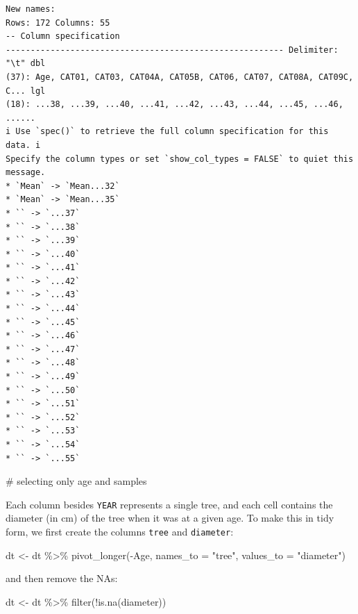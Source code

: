 \documentclass[
  letterpaper,
  DIV=11,
  numbers=noendperiod]{scrreprt}
\newenvironment{Shaded}{\begin{snugshade}}{\end{snugshade}}
\newcommand{\AttributeTok}[1]{\textcolor[rgb]{0.40,0.45,0.13}{#1}}
\newcommand{\CommentTok}[1]{\textcolor[rgb]{0.37,0.37,0.37}{#1}}
\newcommand{\FunctionTok}[1]{\textcolor[rgb]{0.28,0.35,0.67}{#1}}
\newcommand{\NormalTok}[1]{\textcolor[rgb]{0.00,0.23,0.31}{#1}}
\newcommand{\OtherTok}[1]{\textcolor[rgb]{0.00,0.23,0.31}{#1}}
\newcommand{\SpecialCharTok}[1]{\textcolor[rgb]{0.37,0.37,0.37}{#1}}
\newcommand{\StringTok}[1]{\textcolor[rgb]{0.13,0.47,0.30}{#1}}
\begin{document}
\begin{verbatim}
New names:
Rows: 172 Columns: 55
-- Column specification
-------------------------------------------------------- Delimiter: "\t" dbl
(37): Age, CAT01, CAT03, CAT04A, CAT05B, CAT06, CAT07, CAT08A, CAT09C, C... lgl
(18): ...38, ...39, ...40, ...41, ...42, ...43, ...44, ...45, ...46, ......
i Use `spec()` to retrieve the full column specification for this data. i
Specify the column types or set `show_col_types = FALSE` to quiet this message.
* `Mean` -> `Mean...32`
* `Mean` -> `Mean...35`
* `` -> `...37`
* `` -> `...38`
* `` -> `...39`
* `` -> `...40`
* `` -> `...41`
* `` -> `...42`
* `` -> `...43`
* `` -> `...44`
* `` -> `...45`
* `` -> `...46`
* `` -> `...47`
* `` -> `...48`
* `` -> `...49`
* `` -> `...50`
* `` -> `...51`
* `` -> `...52`
* `` -> `...53`
* `` -> `...54`
* `` -> `...55`
\end{verbatim}

\begin{Shaded}
\begin{Highlighting}[]
\CommentTok{\# selecting only age and samples}
\end{Highlighting}
\end{Shaded}

Each column besides \texttt{YEAR} represents a single tree, and each
cell contains the diameter (in cm) of the tree when it was at a given
age. To make this in tidy form, we first create the columns
\texttt{tree} and \texttt{diameter}:

\begin{Shaded}
\begin{Highlighting}[]
\NormalTok{dt }\OtherTok{\textless{}{-}}\NormalTok{ dt }\SpecialCharTok{\%\textgreater{}\%} 
  \FunctionTok{pivot\_longer}\NormalTok{(}\SpecialCharTok{{-}}\NormalTok{Age, }\AttributeTok{names\_to =} \StringTok{"tree"}\NormalTok{, }\AttributeTok{values\_to =} \StringTok{"diameter"}\NormalTok{)}
\end{Highlighting}
\end{Shaded}

and then remove the NAs:

\begin{Shaded}
\begin{Highlighting}[]
\NormalTok{dt }\OtherTok{\textless{}{-}}\NormalTok{ dt }\SpecialCharTok{\%\textgreater{}\%} \FunctionTok{filter}\NormalTok{(}\SpecialCharTok{!}\FunctionTok{is.na}\NormalTok{(diameter))}
\end{Highlighting}
\end{Shaded}
\end{document}
